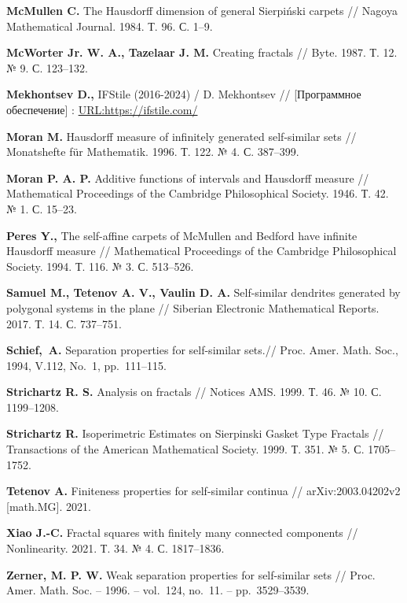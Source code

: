 \begin{thebibliography}{99}
{\bf McMullen C. }
The Hausdorff dimension of general Sierpiński carpets // 
Nagoya Mathematical Journal. 1984. Т. 96. С. 1–9.

{\bf McWorter Jr. W. A., Tazelaar J. M.}
Creating fractals // 
Byte. 1987. Т. 12. № 9. С. 123--132.

{\bf Mekhontsev D.,} 
IFStile (2016-2024) / D. Mekhontsev // [Программное обеспечение] : 
\href{https://ifstile.com/}{URL:https://ifstile.com/}

{\bf Moran M.}
Hausdorff measure of infinitely generated self-similar sets // 
Monatshefte für Mathematik. 1996. Т. 122. № 4. С. 387--399.

{\bf Moran P. A. P. }
Additive functions of intervals and Hausdorff measure // 
Mathematical Proceedings of the Cambridge Philosophical Society. 1946. Т. 42. № 1. С. 15–23.

{\bf Peres Y.,}
The self-affine carpets of McMullen and Bedford have infinite Hausdorff measure // 
Mathematical Proceedings of the Cambridge Philosophical Society. 1994. Т. 116. № 3. С. 513--526.

{\bf Samuel M., Tetenov A. V., Vaulin D. A. }
Self-similar dendrites generated by polygonal systems in the plane //
Siberian Electronic Mathematical Reports. 2017. Т. 14. С. 737--751.

{\bf Schief,~A.}  Separation properties for self-similar sets.// 
Proc. Amer. Math. Soc., 1994, V.112, No.~1, pp.~111--115.

{\bf Strichartz R. S. }
Analysis on fractals // 
Notices AMS. 1999. Т. 46. № 10. С. 1199--1208.

{\bf Strichartz R. }
Isoperimetric Estimates on Sierpinski Gasket Type Fractals // 
Transactions of the American Mathematical Society. 1999. Т. 351. № 5. С. 1705--1752.

{\bf Tetenov A. }
Finiteness properties for self-similar continua // 
arXiv:2003.04202v2 [math.MG]. 2021.

{\bf Xiao J.-C. }
Fractal squares with finitely many connected components // 
Nonlinearity. 2021. Т. 34. № 4. С. 1817--1836.

{\bf Zerner, M. P. W.} 
Weak separation properties for self-similar sets // 
Proc. Amer. Math. Soc.  -- 1996. -- vol.~124, no.~11. -- pp.~3529--3539.


\end{thebibliography}
